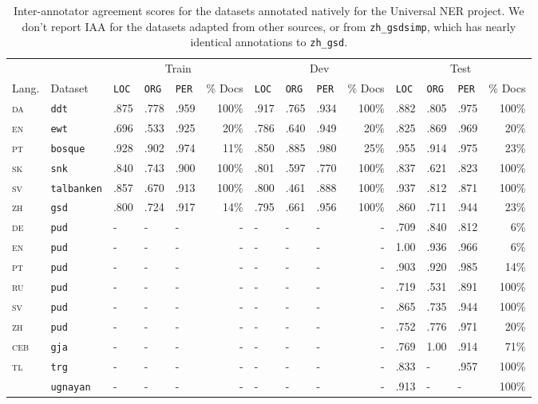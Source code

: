 \begin{table*}[htbp]
\centering
\begin{adjustbox}{max width=\linewidth}
\begin{tabular}{ll lllr lllr lllr}
\toprule
& & \multicolumn{4}{c}{Train} & \multicolumn{4}{c}{Dev} & \multicolumn{4}{c}{Test} \\
\cmidrule(lr){3-6} \cmidrule(lr){7-10} \cmidrule(lr){11-14}
Lang. & Dataset & \texttt{LOC} & \texttt{ORG} & \texttt{PER} & \% Docs & \texttt{LOC} & \texttt{ORG} & \texttt{PER} & \% Docs & \texttt{LOC} & \texttt{ORG} & \texttt{PER} & \% Docs \\
\midrule
\textsc{da} & \texttt{ddt} & .875 & .778 & .959 & 100\% & .917 & .765 & .934 & 100\% & .882 & .805 & .975 & 100\% \\
\textsc{en} & \texttt{ewt} & .696 & .533 & .925 & 20\% & .786 & .640 & .949 & 20\% & .825 & .869 & .969 & 20\% \\
\textsc{pt} & \texttt{bosque} & .928 & .902 & .974 & 11\% & .850 & .885 & .980 & 25\% & .955 & .914 &.975 & 23\% \\
\textsc{sk} & \texttt{snk} & .840 & .743 & .900 & 100\% & .801 & .597 & .770 & 100\% & .837 & .621 & .823 & 100\% \\
\textsc{sv} & \texttt{talbanken} & .857 & .670 & .913 & 100\% & .800 & .461 & .888 & 100\% & .937 & .812 & .871 & 100\% \\
\textsc{zh} & \texttt{gsd} & .800 & .724 & .917 & 14\% & .795 & .661 & .956 & 100\% & .860 & .711  & .944 & 23\% \\
\midrule
\textsc{de} & \texttt{pud} & - & - & - & - & - & - & - & - & .709 & .840 & .812 & 6\% \\
\textsc{en} & \texttt{pud} & - & - & - & - & - & - & - & - & 1.00 & .936 & .966 & 6\% \\
\textsc{pt} & \texttt{pud} & - & - & - & - & - & - & - & - & .903 & .920 & .985 & 14\% \\
\textsc{ru} & \texttt{pud} & - & - & - & - & - & - & - & - & .719 & .531 & .891 & 100\% \\
\textsc{sv} & \texttt{pud} & - & - & - & - & - & - & - & - & .865 & .735 & .944 & 100\% \\
\textsc{zh} & \texttt{pud} & - & - & - & - & - & - & - & - & .752 & .776 & .971 & 20\% \\
\midrule
\textsc{ceb} & \texttt{gja} & - & - & - & - & - & - & - & - & .769 & 1.00 & .914 & 71\% \\
\multirow{2}{*}{\textsc{tl}} & \texttt{trg} & - & - & - & - & - & - & - & - & .833 & - & .957 & 100\% \\
 & \texttt{ugnayan} & - & - & - & - & - & - & - & - & .913 & - & - & 100\% \\

\bottomrule
\end{tabular}
\end{adjustbox}

\caption{Inter-annotator agreement scores for the datasets annotated natively for the Universal NER project. We don't report IAA for the datasets adapted from other sources, or from \texttt{zh\_gsdsimp}, which has nearly identical annotations to \texttt{zh\_gsd}.}
\label{tab:iaa-scores}
\end{table*}

